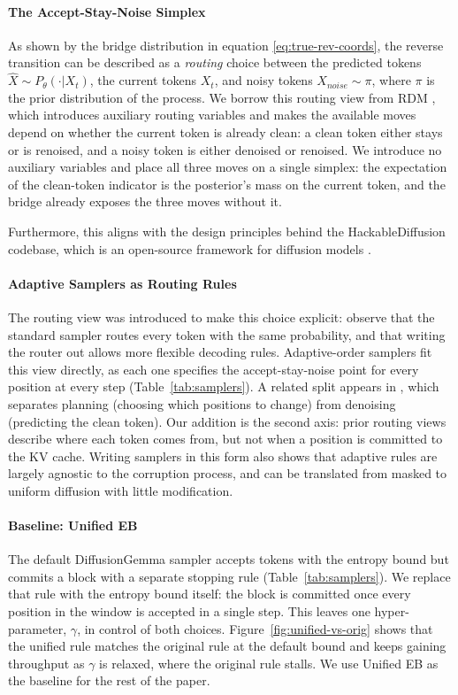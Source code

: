 \paragraph{The Accept-Stay-Noise Simplex}
As shown by the bridge distribution in equation \ref{eq:true-rev-coords}, the reverse transition can be described as a \textit{routing} choice between the predicted tokens $\hat{X} \sim P_{\theta}(\cdot | X_t)$, the current tokens $X_t$, and noisy tokens $X_{noise} \sim \pi$, where $\pi$ is the prior distribution of the process. 
We borrow this routing view from RDM \citep{zheng2023reparameterized}, which introduces auxiliary routing variables and makes the available moves depend on whether the current token is already clean: a clean token either stays or is renoised, and a noisy token is either denoised or renoised.
We introduce no auxiliary variables and place all three moves on a single simplex: the expectation of the clean-token indicator is the posterior's mass on the current token, and the bridge already exposes the three moves without it.

Furthermore, this aligns with the design principles behind the HackableDiffusion codebase, which is an open-source framework for diffusion models \citep{hackable_diffusion2026github}.

\paragraph{Adaptive Samplers as Routing Rules}
The routing view was introduced to make this choice explicit: \citet{zheng2023reparameterized} observe that the standard sampler routes every token with the same probability, and that writing the router out allows more flexible decoding rules.
Adaptive-order samplers fit this view directly, as each one specifies the accept-stay-noise point for every position at every step (Table~\ref{tab:samplers}).
A related split appears in \citet{liu2025think}, which separates planning (choosing which positions to change) from denoising (predicting the clean token).
Our addition is the second axis: prior routing views describe where each token comes from, but not when a position is committed to the KV cache.
Writing samplers in this form also shows that adaptive rules are largely agnostic to the corruption process, and can be translated from masked to uniform diffusion with little modification.

\paragraph{Baseline: Unified EB}
The default DiffusionGemma sampler accepts tokens with the entropy bound but commits a block with a separate stopping rule (Table~\ref{tab:samplers}).
We replace that rule with the entropy bound itself: the block is committed once every position in the window is accepted in a single step.
This leaves one hyper-parameter, $\gamma$, in control of both choices.
Figure~\ref{fig:unified-vs-orig} shows that the unified rule matches the original rule at the default bound and keeps gaining throughput as $\gamma$ is relaxed, where the original rule stalls.
We use Unified EB as the baseline for the rest of the paper.


